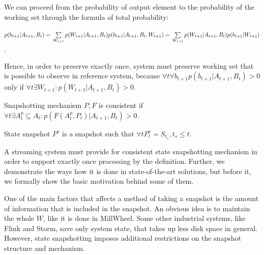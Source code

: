 We can proceed from the probability of output element to the probability of the working set through the formula of total probability:

$p(b_{t+1}|A_{t+1},B_t)=\\
\sum\limits_{W_{t+1}}p(W_{t+1}|A_{t+1},B_t)p(b_{t+1}|A_{t+1},B_t,W_{t+1})=\\
\sum\limits_{W_{t+1}}p(W_{t+1}|A_{t+1},B_t)p(b_{t+1}|W_{t+1})
$.

Hence, in order to preserve exactly once, system must preserve working set that is possible to observe in reference system, because $\forall{t} \forall{b_{t+1}} p(b_{t+1}|A_{t+1},B_t)>0$ only if $\forall{t} \exists{W_{t+1}}:p(W_{t+1}|A_{t+1},B_t)>0$.

\begin{definition}{Snapshotting mechanism $P,F$ is consistent}
if $\forall{t} \exists{A^{p}_t\subseteq{A_t}} : p(F(A^{p}_t,P_t)|A_{t+1},B_t)>0$.
\end{definition}


\begin{definition}{State snapshot}
$P^{s}$ is a snapshot such that $\forall{t} P^{s}_t = S_{t_s},t_s \leq t$.
\end{definition}

A streaming system must provide for consistent state snapshotting mechanism in order to support exactly once processing by the definition. Further, we demonstrate the ways how it is done in state-of-the-art solutions, but before it, we formally show the basic motivation behind some of them. 

One of the main factors that affects a method of taking a snapshot is the amount of information that is included in the snapshot. An obvious idea is to maintain the whole $W$, like it is done in MillWheel. Some other industrial systems, like Flink and Storm, save only system state, that takes up less disk space in general. However, state snapshotting imposes additional restrictions on the snapshot structure and mechanism.

